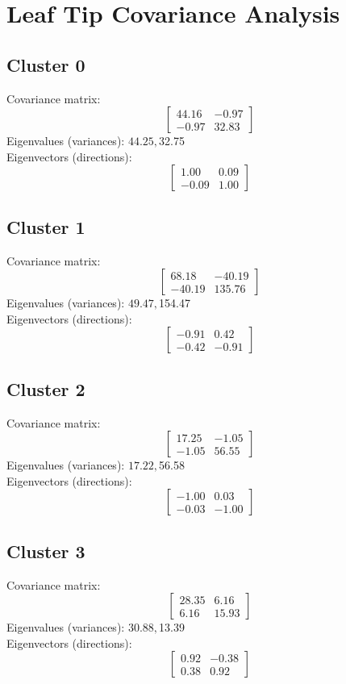 \documentclass{article}
\begin{document}
\section*{Leaf Tip Covariance Analysis}
\subsection*{Cluster 0}
Covariance matrix:
\[\begin{bmatrix}44.16 & -0.97 \\-0.97 & 32.83\end{bmatrix}\]
Eigenvalues (variances): $ 44.25, $32.75\\
Eigenvectors (directions):
\[\begin{bmatrix}1.00 & 0.09 \\-0.09 & 1.00\end{bmatrix}\]
\subsection*{Cluster 1}
Covariance matrix:
\[\begin{bmatrix}68.18 & -40.19 \\-40.19 & 135.76\end{bmatrix}\]
Eigenvalues (variances): $ 49.47, $154.47\\
Eigenvectors (directions):
\[\begin{bmatrix}-0.91 & 0.42 \\-0.42 & -0.91\end{bmatrix}\]
\subsection*{Cluster 2}
Covariance matrix:
\[\begin{bmatrix}17.25 & -1.05 \\-1.05 & 56.55\end{bmatrix}\]
Eigenvalues (variances): $ 17.22, $56.58\\
Eigenvectors (directions):
\[\begin{bmatrix}-1.00 & 0.03 \\-0.03 & -1.00\end{bmatrix}\]
\subsection*{Cluster 3}
Covariance matrix:
\[\begin{bmatrix}28.35 & 6.16 \\6.16 & 15.93\end{bmatrix}\]
Eigenvalues (variances): $ 30.88, $13.39\\
Eigenvectors (directions):
\[\begin{bmatrix}0.92 & -0.38 \\0.38 & 0.92\end{bmatrix}\]
\end{document}
